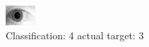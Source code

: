 \begin{figure}[h!]
\begin{center}
\includegraphics[width=0.60\columnwidth]{figures/ID1828_class_4_target_3.png}
\end{center}
\caption{ Classification: 4 actual target: 3}
\label{fig:ID1828_class_4_target_3}
\end{figure}
